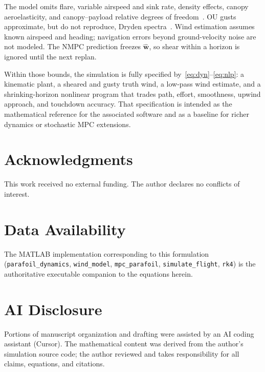 \documentclass[conference]{IEEEtran}
\begin{document}
The model omits flare, variable airspeed and sink rate, density effects, canopy aeroelasticity, and canopy--payload relative degrees of freedom~\cite{Zhao2023,Wei2024}.
OU gusts approximate, but do not reproduce, Dryden spectra~\cite{Beal1993}.
Wind estimation assumes known airspeed and heading; navigation errors beyond ground-velocity noise are not modeled.
The NMPC prediction freezes $\hat{\mathbf{w}}$, so shear within a horizon is ignored until the next replan.

Within those bounds, the simulation is fully specified by~\eqref{eq:dyn}--\eqref{eq:nlp}: a kinematic plant, a sheared and gusty truth wind, a low-pass wind estimate, and a shrinking-horizon nonlinear program that trades path, effort, smoothness, upwind approach, and touchdown accuracy.
That specification is intended as the mathematical reference for the associated software and as a baseline for richer dynamics or stochastic MPC extensions.

\section*{Acknowledgments}

This work received no external funding.
The author declares no conflicts of interest.

\section*{Data Availability}

The MATLAB implementation corresponding to this formulation (\texttt{parafoil\_dynamics}, \texttt{wind\_model}, \texttt{mpc\_parafoil}, \texttt{simulate\_flight}, \texttt{rk4}) is the authoritative executable companion to the equations herein.

\section*{AI Disclosure}

Portions of manuscript organization and drafting were assisted by an AI coding assistant (Cursor).
The mathematical content was derived from the author's simulation source code; the author reviewed and takes responsibility for all claims, equations, and citations.
\end{document}
